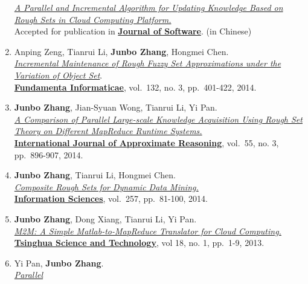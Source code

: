 \documentclass[]{article}
\begin{document}
\begin{enumerate}
  \href{http://dx.doi.org/10.13328/j.cnki.jos.004590}{\emph{A Parallel
  and Incremental Algorithm for Updating Knowledge Based on Rough Sets
  in Cloud Computing Platform.}}\\ Accepted for publication in
  \href{http://www.jos.org.cn/ch/index.aspx}{\textbf{Journal of
  Software}}. (in Chinese)
\item
  Anping Zeng, Tianrui Li, \textbf{Junbo Zhang}, Hongmei Chen.\\
  \href{http://dx.doi.org/10.3233/FI-2014-1051}{\emph{Incremental
  Maintenance of Rough Fuzzy Set Approximations under the Variation of
  Object Set}}.\\
  \href{http://www.iospress.nl/journal/fundamenta-informaticae}{\textbf{Fundamenta
  Informaticae}}, vol.~132, no. 3, pp.~401-422, 2014.
\item
  \textbf{Junbo Zhang}, Jian-Syuan Wong, Tianrui Li, Yi Pan.\\
  \href{http://dx.doi.org/10.1016/j.ijar.2013.08.003}{\emph{A Comparison
  of Parallel Large-scale Knowledge Acquisition Using Rough Set Theory
  on Different MapReduce Runtime Systems.}}\\
  \href{http://www.journals.elsevier.com/international-journal-of-approximate-reasoning}{\textbf{International
  Journal of Approximate Reasoning}}, vol.~55, no. 3, pp.~896-907, 2014.
\item
  \textbf{Junbo Zhang}, Tianrui Li, Hongmei Chen.\\
  \href{http://dx.doi.org/10.1016/j.ins.2013.08.016}{\emph{Composite
  Rough Sets for Dynamic Data Mining.}}\\
  \href{http://www.journals.elsevier.com/information-sciences}{\textbf{Information
  Sciences}}, vol.~257, pp.~81-100, 2014.
\item
  \textbf{Junbo Zhang}, Dong Xiang, Tianrui Li, Yi Pan.\\
  \href{http://ieeexplore.ieee.org/xpl/articleDetails.jsp?tp=\&arnumber=6449402\&contentType=Journals+\%26+Magazines\&queryText\%3DM2M\%3A+A+simple+Matlab-to-MapReduce+translator+for+Cloud+Computing}{\emph{M2M:
  A Simple Matlab-to-MapReduce Translator for Cloud Computing.}}\\
  \href{http://qhxb.lib.tsinghua.edu.cn/english/}{\textbf{Tsinghua
  Science and Technology}}, vol 18, no. 1, pp.~1-9, 2013.
\item
  Yi Pan, \textbf{Junbo Zhang}.\\
  \href{http://www.ftrai.org/xe/index.php?mid=joc_published\&category=37964\&search_keyword=section\&search_target=title\&document_srl=38459}{\emph{Parallel
}}
\end{enumerate}
\end{document}

